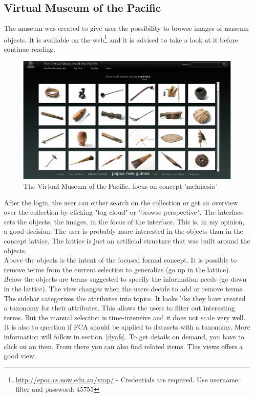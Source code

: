 \documentclass[11pt]{report}
\begin{document}
\subsection{Virtual Museum of the Pacific}
\label{Museum}
 
The museum was created to give user the possibility to browse images of museum objects. It is available on the web\footnote{\url{http://epoc.cs.uow.edu.au/vmp/} - Credentials are required. Use username: filter and password: 45755} and it is advised to take a look at it before continue reading. \\

\begin{figure}[!ht]
	\centering
	\includegraphics[width=\linewidth]{images/pacific}
\caption{The Virtual Museum of the Pacific, focus on concept 'melanesia'}
\label{figure:pacific}
\end{figure}

After the login, the user can either search on the collection or get an overview over the collection by clicking "tag cloud" or "browse perspective". The interface sets the objects, the images, in the focus of the interface. This is, in my opinion, a good decision. The user is probably more interested in the objects than in the concept lattice. The lattice is just an artificial structure that was built around the objects. \\
 
 Above the objects is the intent of the focused formal concept. It is possible to remove terms from the current selection to generalize (go up in the lattice). Below the objects are terms suggested to specify the information needs (go down in the lattice). The view changes when the users decide to add or remove terms. The sidebar categorizes the attributes into topics. It looks like they have created a taxonomy for their attributes. This allows the users to filter out interesting terms. But the manual selection is time-intensive and it does not scale very well. It is also to question if FCA should be applied to datasets with a taxonomy. More information will follow in section~\ref{dyafs}. To get details on demand, you have to click on an item. From there you can also find related items. This views offers a good view.\\
 
\end{document}
